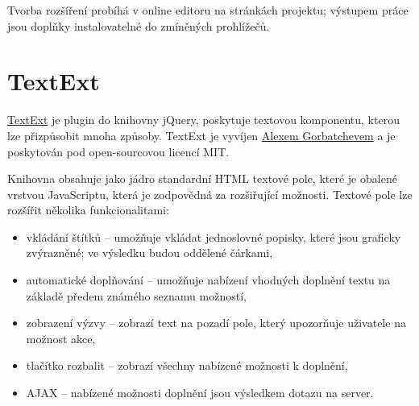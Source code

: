 Tvorba rozšíření probíhá v online editoru na stránkách projektu; výstupem práce jsou doplňky instalovatelné do zmíněných prohlížečů.

\section{TextExt}

\href{http://textextjs.com/}{TextExt} je plugin do knihovny jQuery, poskytuje textovou komponentu, kterou lze přizpůsobit mnoha způsoby.
TextExt je vyvíjen \href{mailto:alex.gorbatchev@gmail.com}{Alexem Gorbatchevem} a je poskytován pod open-sourcovou licencí MIT.

Knihovna obsahuje jako jádro standardní HTML textové pole, které je obalené vrstvou JavaScriptu, která je zodpovědná za rozšiřující možnosti.
Textové pole lze rozšířit několika funkcionalitami:
\begin{itemize}
	\item vkládání štítků -- umožňuje vkládat jednoslovné popisky, které jsou graficky zvýrazněné; ve výsledku budou oddělené čárkami,
	\item automatické doplňování -- umožňuje nabízení vhodných doplnění textu na základě předem známého seznamu možností,
	\item zobrazení výzvy -- zobrazí text na pozadí pole, který upozorňuje uživatele na možnost akce,
	\item tlačítko rozbalit -- zobrazí všechny nabízené možnosti k doplnění,
	\item AJAX -- nabízené možnosti doplnění jsou výsledkem dotazu na server.
\end{itemize}

